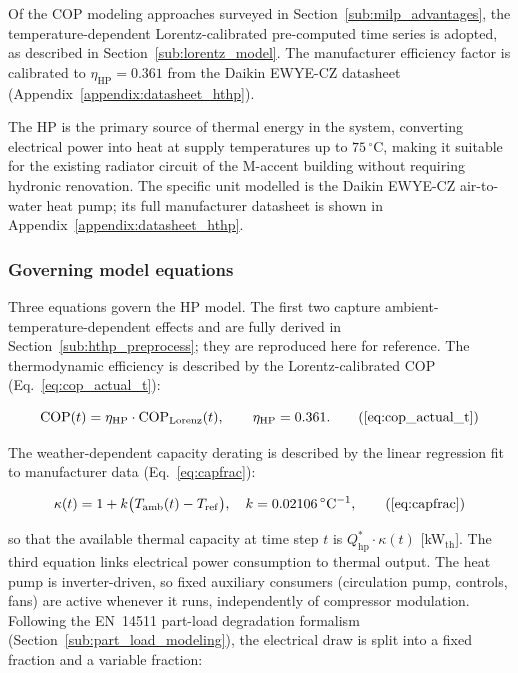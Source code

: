 \documentclass[11pt,a4paper]{report}
\begin{document}
Of the COP modeling approaches surveyed in Section~\ref{sub:milp_advantages}, the temperature-dependent Lorentz-calibrated pre-computed time series is adopted, as described in Section~\ref{sub:lorentz_model}.
The manufacturer efficiency factor is calibrated to $\eta_\mathrm{HP} = 0.361$ from the Daikin EWYE-CZ datasheet (Appendix~\ref{appendix:datasheet_hthp}).

The HP is the primary source of thermal energy in the system,
converting electrical power into heat at supply temperatures up to $75\,^{\circ}\mathrm{C}$,
making it suitable for the existing radiator circuit of the M-accent building without requiring
hydronic renovation.
The specific unit modelled is the Daikin EWYE-CZ air-to-water heat pump; its full manufacturer
datasheet is shown in Appendix~\ref{appendix:datasheet_hthp}.

\subsubsection{Governing model equations}
\label{sub:hthp_equations}

Three equations govern the HP model.
The first two capture ambient-temperature-dependent effects and are fully derived in
Section~\ref{sub:hthp_preprocess}; they are reproduced here for reference.
The thermodynamic efficiency is described by the Lorentz-calibrated COP
(Eq.~\eqref{eq:cop_actual_t}):

\begin{equation}
    \mathrm{COP}(t) = \eta_\mathrm{HP} \cdot \mathrm{COP}_\mathrm{Lorenz}(t),
    \qquad \eta_\mathrm{HP} = 0.361. \tag{\ref{eq:cop_actual_t}}
\end{equation}

\noindent The weather-dependent capacity derating is described by the linear regression
fit to manufacturer data (Eq.~\eqref{eq:capfrac}):

\begin{equation}
    \kappa(t) = 1 + k\bigl(T_\mathrm{amb}(t) - T_\mathrm{ref}\bigr),
    \quad k = 0.02106\,^{\circ}\mathrm{C}^{-1}, \tag{\ref{eq:capfrac}}
\end{equation}

\noindent so that the available thermal capacity at time step $t$ is
$Q_\mathrm{hp}^{*}\cdot\kappa(t)$ [kW$_\mathrm{th}$].
The third equation links electrical power consumption to thermal output.
The heat pump is inverter-driven, so fixed auxiliary consumers (circulation pump,
controls, fans) are active whenever it runs, independently of compressor modulation.
Following the EN~14511 part-load degradation formalism
(Section~\ref{sub:part_load_modeling}), the electrical draw is split into a fixed
fraction and a variable fraction:
\end{document}
